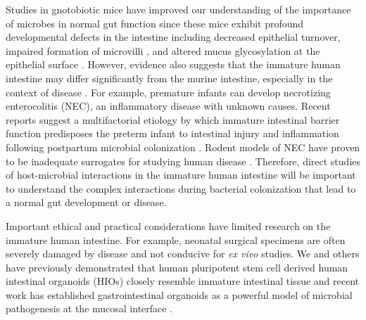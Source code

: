 \documentclass[9pt,lineo]{elife}
\begin{document}
Studies in gnotobiotic mice have improved our understanding of the importance of microbes in normal gut function since these mice exhibit profound developmental defects in the intestine \citep{Round:2009,Gensollen:2016,Bry:1996,Hooper:1999} including decreased epithelial turnover, impaired formation of microvilli \citep{ABRAMS:1963}, and altered mucus glycosylation at the epithelial surface \citep{Bry:1996,Goto:2014,Cash:2006}. However, evidence also suggests that the immature human intestine may differ significantly from the murine intestine, especially in the context of disease \citep{Nguyen:2015}. For example, premature infants can develop necrotizing enterocolitis (NEC), an inflammatory disease with unknown causes. Recent reports suggest a multifactorial etiology by which immature intestinal barrier function predisposes the preterm infant to intestinal injury and inflammation following postpartum microbial colonization \citep{Neu:2011,Morrow:2013,Greenwood:2014,Hackam:2013,Afrazi:2014,Fusunyan:2001,Nanthakumar:2011}. Rodent models of NEC have proven to be inadequate surrogates for studying human disease \citep{Tanner:2015}. Therefore, direct studies of host-microbial interactions in the immature human intestine will be important to understand the complex interactions during bacterial colonization that lead to a normal gut development or disease.

Important ethical and practical considerations have limited research on the immature human intestine. For example, neonatal surgical specimens are often severely damaged by disease and not conducive for \emph{ex vivo} studies. We and others have previously demonstrated that human pluripotent stem cell derived human intestinal organoids (HIOs) closely resemble immature intestinal tissue \citep{Spence:2011,Finkbeiner:2015,Watson:2014,Forster:2014,Dedhia:2016,Aurora:2016,Chin:2017} and recent work has established gastrointestinal organoids as a powerful model of microbial pathogenesis at the mucosal interface \citep{Leslie:2015,McCracken:2014,Forbester:2015, Hill:2017}. 
\end{document}
